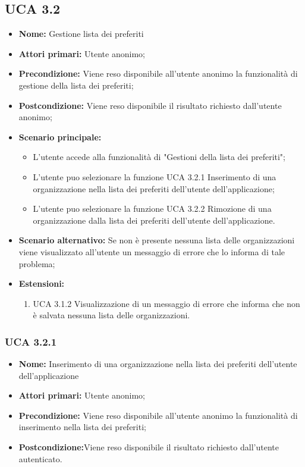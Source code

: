 \subsection{UCA 3.2}%
\begin{itemize}
	\item \textbf{Nome:} Gestione lista dei preferiti
	\item \textbf{Attori primari:} Utente anonimo;
	\item \textbf{Precondizione:} Viene reso disponibile all’utente anonimo la funzionalità di gestione della lista dei preferiti; 
	\item \textbf{Postcondizione:} Viene reso disponibile il risultato richiesto dall’utente anonimo;
	\item \textbf{Scenario principale:}
			\begin{itemize}
			\item L’utente accede alla funzionalità di "Gestioni della lista dei preferiti";
			\item L'utente puo selezionare la funzione UCA 3.2.1 Inserimento di una organizzazione nella lista dei preferiti dell’utente dell’applicazione;
			\item L'utente puo selezionare la funzione UCA 3.2.2 Rimozione di una organizzazione dalla lista dei preferiti dell’utente dell’applicazione.
			\end{itemize}
	\item \textbf{Scenario alternativo:}	Se non è presente nessuna lista delle organizzazioni viene visualizzato all’utente un messaggio di errore che lo informa di tale problema;
	\item \textbf{Estensioni:}
	\begin{enumerate}
		\item UCA 3.1.2 Visualizzazione di un messaggio di errore che informa che non è salvata nessuna lista delle organizzazioni.
	\end{enumerate}
\end{itemize}

\subsubsection{UCA 3.2.1}%
\begin{itemize}
	\item \textbf{Nome:} Inserimento di una organizzazione nella lista dei preferiti dell’utente dell’applicazione
	\item \textbf{Attori primari:} Utente anonimo;
	\item \textbf{Precondizione:} Viene reso disponibile all’utente anonimo la funzionalità di inserimento nella lista dei preferiti; 
	\item \textbf{Postcondizione:}Viene reso disponibile il risultato richiesto dall’utente autenticato.
\end{itemize}

